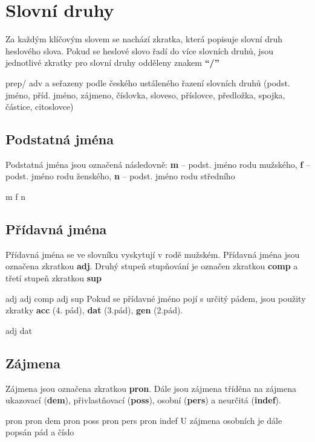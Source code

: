 \section{Slovní druhy}
Za každým klíčovým slovem se nachází zkratka, která popisuje slovní druh heslového slova. Pokud se heslové slovo řadí do více slovních druhů, jsou jednotlivé zkratky pro slovní druhy odděleny znakem \textbf{“/”}


 {\small{prep/ adv}}
a seřazeny podle českého ustáleného řazení slovních druhů (podst. jméno, příd. jméno, zájmeno, číslovka, sloveso, příslovce, předložka, spojka, částice, citoslovce)

\subsection{Podstatná jména}
Podstatná jména jsou označená následovně: \textbf{m} – podst. jméno rodu mužského, \textbf{f} – podst. jméno rodu ženského, \textbf{n} – podst. jméno rodu středního

	
 {\small{ m}}
 {\small{f}}
 {\small{n}}

\subsection{Přídavná jména}
Přídavná jména se ve slovníku vyskytují v rodě mužském. Přídavná jména jsou označena zkratkou \textbf{adj}. Druhý stupeň stupňování je označen zkratkou \textbf{comp} a třetí stupeň zkratkou \textbf{sup}


 {\small{ adj}}
 {\small{ adj comp}}
 {\small{ adj sup}}
Pokud se přídavné jméno pojí s určitý pádem, jsou použity zkratky \textbf{acc} (4. pád), \textbf{dat} (3.pád), \textbf{gen} (2.pád).


 {\small{ adj dat}}

\subsection{Zájmena}
Zájmena jsou označena zkratkou \textbf{pron}. Dále jsou zájmena tříděna na zájmena ukazovací (\textbf{dem}), přivlastňovací (\textbf{poss}), osobní (\textbf{pers}) a neurčitá (\textbf{indef}).


 {\small{ pron}}
 {\small{ pron dem}}
 {\small{ pron poss}}
 {\small{ pron pers }}
 {\small{ pron indef}}
U zájmena osobních je dále popsán pád a číslo


